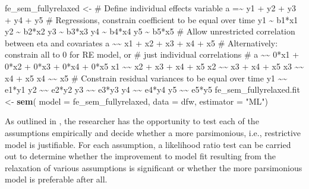 \documentclass[]{interact}
\theoremstyle{plain}%
\theoremstyle{definition}
\theoremstyle{remark}
\newenvironment{Shaded}{\begin{snugshade}}{\end{snugshade}}
\newcommand{\DataTypeTok}[1]{\textcolor[rgb]{0.13,0.29,0.53}{#1}}
\newcommand{\KeywordTok}[1]{\textcolor[rgb]{0.13,0.29,0.53}{\textbf{#1}}}
\newcommand{\NormalTok}[1]{#1}
\newcommand{\StringTok}[1]{\textcolor[rgb]{0.31,0.60,0.02}{#1}}
\begin{document}
\begin{Shaded}
\begin{Highlighting}[numbers=left,,]
\NormalTok{fe\_sem\_fullyrelaxed \textless{}{-}}\StringTok{ \textquotesingle{}}
\StringTok{\# Define individual effects variable }
\StringTok{a =\textasciitilde{} y1 + y2 + y3 + y4 + y5}
\StringTok{\# Regressions, constrain coefficient to be equal over time}
\StringTok{y1 \textasciitilde{} b1*x1}
\StringTok{y2 \textasciitilde{} b2*x2 }
\StringTok{y3 \textasciitilde{} b3*x3}
\StringTok{y4 \textasciitilde{} b4*x4}
\StringTok{y5 \textasciitilde{} b5*x5}
\StringTok{\# Allow unrestricted correlation between eta and covariates}
\StringTok{a \textasciitilde{}\textasciitilde{} x1 + x2 + x3 + x4 + x5}
\StringTok{\# Alternatively: constrain all to 0 for RE model, or}
\StringTok{\# just individual correlations}
\StringTok{\# a \textasciitilde{}\textasciitilde{} 0*x1 + 0*x2 + 0*x3 + 0*x4 + 0*x5}
\StringTok{x1 \textasciitilde{}\textasciitilde{} x2 + x3 + x4 + x5}
\StringTok{x2 \textasciitilde{}\textasciitilde{} x3 + x4 + x5}
\StringTok{x3 \textasciitilde{}\textasciitilde{} x4 + x5}
\StringTok{x4 \textasciitilde{}\textasciitilde{} x5}
\StringTok{\# Constrain residual variances to be equal over time}
\StringTok{y1 \textasciitilde{}\textasciitilde{} e1*y1}
\StringTok{y2 \textasciitilde{}\textasciitilde{} e2*y2}
\StringTok{y3 \textasciitilde{}\textasciitilde{} e3*y3}
\StringTok{y4 \textasciitilde{}\textasciitilde{} e4*y4}
\StringTok{y5 \textasciitilde{}\textasciitilde{} e5*y5}
\StringTok{\textquotesingle{}}
\NormalTok{fe\_sem\_fullyrelaxed.fit \textless{}{-}}\StringTok{ }\KeywordTok{sem}\NormalTok{( }\DataTypeTok{model =}\NormalTok{ fe\_sem\_fullyrelaxed, }
                                \DataTypeTok{data =}\NormalTok{ dfw, }
                                \DataTypeTok{estimator =} \StringTok{"ML"}\NormalTok{)}
\end{Highlighting}
\end{Shaded}

\doublespacing

\singlespacing

\doublespacing

As outlined in \citet{Bollen2010}, the researcher has the opportunity to
test each of the assumptions empirically and decide whether a more
parsimonious, i.e., restrictive model is justifiable. For each
assumption, a likelihood ratio test can be carried out to determine
whether the improvement to model fit resulting from the relaxation of
various assumptions is significant or whether the more parsimonious
model is preferable after all.
\end{document}
